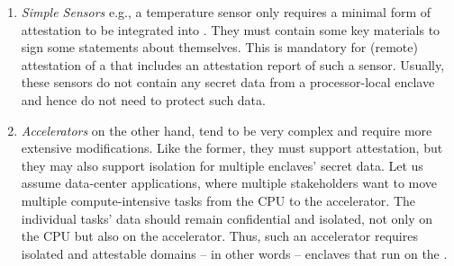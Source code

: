 \begin{enumerate}
\item\emph{Simple Sensors} e.g., a temperature sensor only requires a minimal form of attestation to be integrated into \name{}. They must contain some key materials to sign some statements about themselves. This is mandatory for (remote) attestation of a \nameenclave that includes an attestation report of such a sensor. Usually, these sensors do not contain any secret data from a processor-local enclave and hence do not need to protect such data.

\item\emph{Accelerators} on the other hand, tend to be very complex and require more extensive modifications. Like the former, they must support attestation, but they may also support isolation for multiple enclaves' secret data. Let us assume data-center applications, where multiple stakeholders want to move multiple compute-intensive tasks from the CPU to the accelerator. The individual tasks' data should remain confidential and isolated, not only on the CPU but also on the accelerator. Thus, such an accelerator requires isolated and attestable domains -- in other words -- enclaves that run on the \sphw. 

\end{enumerate}



